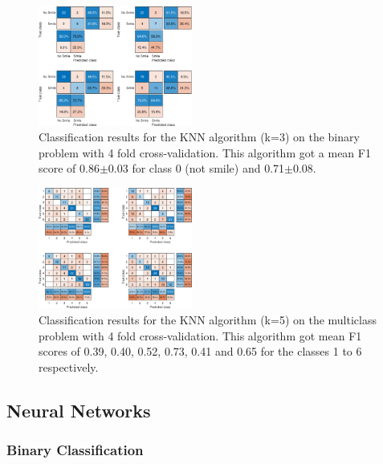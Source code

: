 \documentclass[%
 reprint,
 amsmath,amssymb,
 aps,
]{revtex4-1}
\begin{document}
\begin{figure}
    \centering
    \includegraphics[width=0.45\textwidth]{binaryknn.eps}
    \caption{Classification results for the KNN algorithm (k=3) on the binary problem with 4 fold cross-validation. This algorithm got a mean F1 score of 0.86$\pm$0.03 for class 0 (not smile) and 0.71$\pm$0.08.}
    \label{fig:knn_bin}
\end{figure}

\begin{figure}
    \centering
    \includegraphics[width=0.45\textwidth]{multiknn.eps}
    \caption{Classification results for the KNN algorithm (k=5) on the multiclass problem with 4 fold cross-validation. This algorithm got mean F1 scores of 0.39, 0.40, 0.52, 0.73, 0.41 and 0.65 for the classes 1 to 6 respectively.}
    \label{fig:knn_multi}
\end{figure}

\subsection{Neural Networks}

\subsubsection{Binary Classification}
\end{document}
